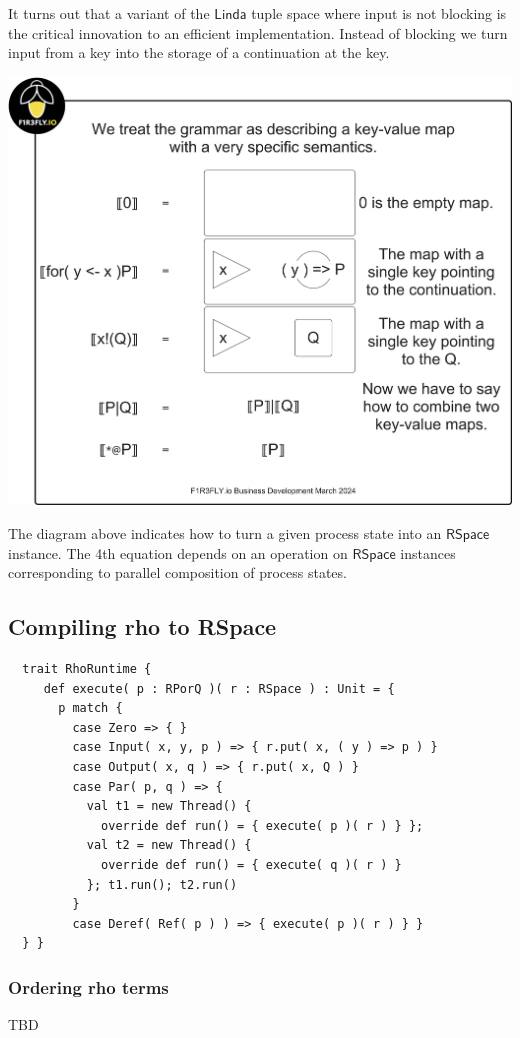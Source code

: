 It turns out that a variant of the $\mathsf{Linda}$ tuple space where
input is not blocking is the critical innovation to an efficient
implementation. Instead of blocking we turn input from a key into the
storage of a continuation at the key.

\includegraphics[scale=0.4]{RHO20RSpaceSlide1.pdf}

The diagram above indicates how to turn a given process state into an
$\mathsf{RSpace}$ instance. The 4th equation depends on an operation
on $\mathsf{RSpace}$ instances corresponding to parallel composition
of process states.

\subsection{Compiling rho to RSpace}

\begin{lstlisting}
  trait RhoRuntime {
     def execute( p : RPorQ )( r : RSpace ) : Unit = {
       p match {
         case Zero => { }
         case Input( x, y, p ) => { r.put( x, ( y ) => p ) }
         case Output( x, q ) => { r.put( x, Q ) }
         case Par( p, q ) => {
           val t1 = new Thread() {
             override def run() = { execute( p )( r ) } };
           val t2 = new Thread() {
             override def run() = { execute( q )( r ) }
           }; t1.run(); t2.run()
         }
         case Deref( Ref( p ) ) => { execute( p )( r ) } }
  } }
\end{lstlisting}

\subsubsection{Ordering rho terms}

TBD
